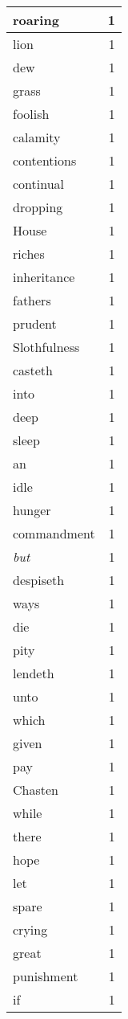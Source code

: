 \begin{center}
\begin{longtable}{l|r}
roaring & 1\\ \hline 
lion & 1\\ \hline 
dew & 1\\ \hline 
grass & 1\\ \hline 
foolish & 1\\ \hline 
calamity & 1\\ \hline 
contentions & 1\\ \hline 
continual & 1\\ \hline 
dropping & 1\\ \hline 
House & 1\\ \hline 
riches & 1\\ \hline 
inheritance & 1\\ \hline 
fathers & 1\\ \hline 
prudent & 1\\ \hline 
Slothfulness & 1\\ \hline 
casteth & 1\\ \hline 
into & 1\\ \hline 
deep & 1\\ \hline 
sleep & 1\\ \hline 
an & 1\\ \hline 
idle & 1\\ \hline 
hunger & 1\\ \hline 
commandment & 1\\ \hline 
\emph{but} & 1\\ \hline 
despiseth & 1\\ \hline 
ways & 1\\ \hline 
die & 1\\ \hline 
pity & 1\\ \hline 
lendeth & 1\\ \hline 
unto & 1\\ \hline 
which & 1\\ \hline 
given & 1\\ \hline 
pay & 1\\ \hline 
Chasten & 1\\ \hline 
while & 1\\ \hline 
there & 1\\ \hline 
hope & 1\\ \hline 
let & 1\\ \hline 
spare & 1\\ \hline 
crying & 1\\ \hline 
great & 1\\ \hline 
punishment & 1\\ \hline 
if & 1\\ \hline 

\end{longtable}
\end{center}
